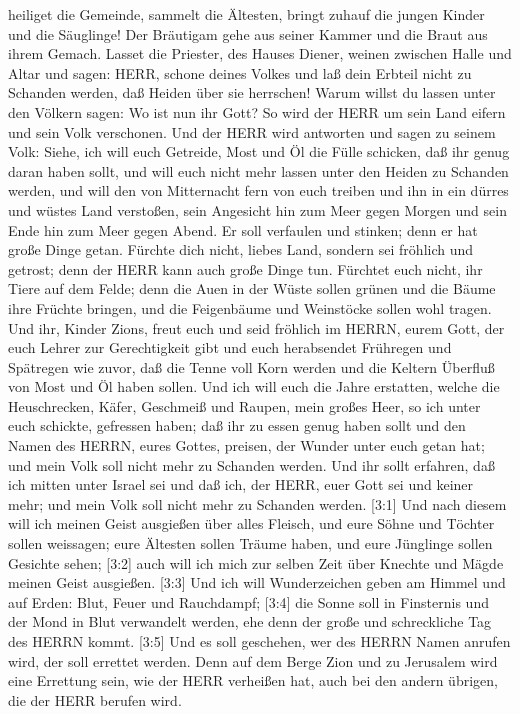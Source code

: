 heiliget die Gemeinde, sammelt die Ältesten, bringt zuhauf die jungen
Kinder und die Säuglinge! Der Bräutigam gehe aus seiner Kammer und die
Braut aus ihrem Gemach.  Lasset die Priester, des Hauses
Diener, weinen zwischen Halle und Altar und sagen: HERR, schone deines
Volkes und laß dein Erbteil nicht zu Schanden werden, daß Heiden über
sie herrschen! Warum willst du lassen unter den Völkern sagen: Wo ist
nun ihr Gott?  So wird der HERR um sein Land eifern und
sein Volk verschonen.  Und der HERR wird antworten und
sagen zu seinem Volk: Siehe, ich will euch Getreide, Most und Öl die
Fülle schicken, daß ihr genug daran haben sollt, und will euch nicht
mehr lassen unter den Heiden zu Schanden werden,  und will
den von Mitternacht fern von euch treiben und ihn in ein dürres und
wüstes Land verstoßen, sein Angesicht hin zum Meer gegen Morgen und sein
Ende hin zum Meer gegen Abend. Er soll verfaulen und stinken; denn er
hat große Dinge getan.  Fürchte dich nicht, liebes Land,
sondern sei fröhlich und getrost; denn der HERR kann auch große Dinge
tun.  Fürchtet euch nicht, ihr Tiere auf dem Felde; denn
die Auen in der Wüste sollen grünen und die Bäume ihre Früchte bringen,
und die Feigenbäume und Weinstöcke sollen wohl tragen.  Und
ihr, Kinder Zions, freut euch und seid fröhlich im HERRN, eurem Gott,
der euch Lehrer zur Gerechtigkeit gibt und euch herabsendet Frühregen
und Spätregen wie zuvor,  daß die Tenne voll Korn werden
und die Keltern Überfluß von Most und Öl haben sollen.  Und
ich will euch die Jahre erstatten, welche die Heuschrecken, Käfer,
Geschmeiß und Raupen, mein großes Heer, so ich unter euch schickte,
gefressen haben;  daß ihr zu essen genug haben sollt und
den Namen des HERRN, eures Gottes, preisen, der Wunder unter euch getan
hat; und mein Volk soll nicht mehr zu Schanden werden.  Und
ihr sollt erfahren, daß ich mitten unter Israel sei und daß ich, der
HERR, euer Gott sei und keiner mehr; und mein Volk soll nicht mehr zu
Schanden werden.  {[}3:1{]} Und nach diesem will ich meinen
Geist ausgießen über alles Fleisch, und eure Söhne und Töchter sollen
weissagen; eure Ältesten sollen Träume haben, und eure Jünglinge sollen
Gesichte sehen;  {[}3:2{]} auch will ich mich zur selben
Zeit über Knechte und Mägde meinen Geist ausgießen. 
{[}3:3{]} Und ich will Wunderzeichen geben am Himmel und auf Erden:
Blut, Feuer und Rauchdampf;  {[}3:4{]} die Sonne soll in
Finsternis und der Mond in Blut verwandelt werden, ehe denn der große
und schreckliche Tag des HERRN kommt.  {[}3:5{]} Und es
soll geschehen, wer des HERRN Namen anrufen wird, der soll errettet
werden. Denn auf dem Berge Zion und zu Jerusalem wird eine Errettung
sein, wie der HERR verheißen hat, auch bei den andern übrigen, die der
HERR berufen wird.

